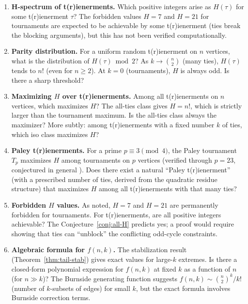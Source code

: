 \documentclass[12pt,reqno]{amsart}
\theoremstyle{definition}
\theoremstyle{plain}
\begin{document}
\begin{enumerate}[label=\textbf{Q\arabic*.}]

\item \textbf{H-spectrum of t(r)ienerments.}
  Which positive integers arise as $H(\tau)$ for some t(r)ienerment $\tau$?
  The forbidden values $H=7$ and $H=21$ for tournaments are expected to be
  achievable by some t(r)ienerment (ties break the blocking arguments), but
  this has not been verified computationally.

\item \textbf{Parity distribution.}
  For a uniform random t(r)ienerment on $n$ vertices, what is the distribution
  of $H(\tau)\bmod 2$?  As $k\to\binom{n}{2}$ (many ties), $H(\tau)$ tends to
  $n!$ (even for $n\ge 2$).  At $k=0$ (tournaments), $H$ is always odd.
  Is there a sharp threshold?

\item \textbf{Maximizing $H$ over t(r)ienerments.}
  Among all t(r)ienerments on $n$ vertices, which maximizes $H$?
  The all-ties class gives $H=n!$, which is strictly larger than the
  tournament maximum.  Is the all-ties class always the maximizer?
  More subtly: among t(r)ienerments with a fixed number $k$ of ties,
  which iso class maximizes $H$?

\item \textbf{Paley t(r)ienerments.}
  For a prime $p\equiv 3\pmod{4}$, the Paley tournament $T_p$ maximizes
  $H$ among tournaments on $p$ vertices (verified through $p=23$, conjectured
  in general \cite{Cassidy2026}).  Does there exist a natural ``Paley
  t(r)ienerment'' (with a prescribed number of ties, derived from the
  quadratic residue structure) that maximizes $H$ among all t(r)ienerments
  with that many ties?

\item \textbf{Forbidden $H$ values.}
  As noted, $H=7$ and $H=21$ are permanently forbidden for tournaments.
  For t(r)ienerments, are all positive integers achievable?
  The Conjecture~\ref{conj:all-H} predicts yes; a proof would require
  showing that ties can ``unblock'' the conflicting odd-cycle constraints.

\item \textbf{Algebraic formula for $f(n,k)$.}
  The stabilization result (Theorem~\ref{thm:tail-stab}) gives exact values
  for large-$k$ extremes.  Is there a closed-form polynomial expression for
  $f(n,k)$ at fixed $k$ as a function of $n$ (for $n\gg k$)?
  The Burnside generating function suggests $f(n,k)\sim \binom{n}{2}^k/k!$
  (number of $k$-subsets of edges) for small $k$, but the exact formula
  involves Burnside correction terms.


\end{enumerate}
\end{document}
